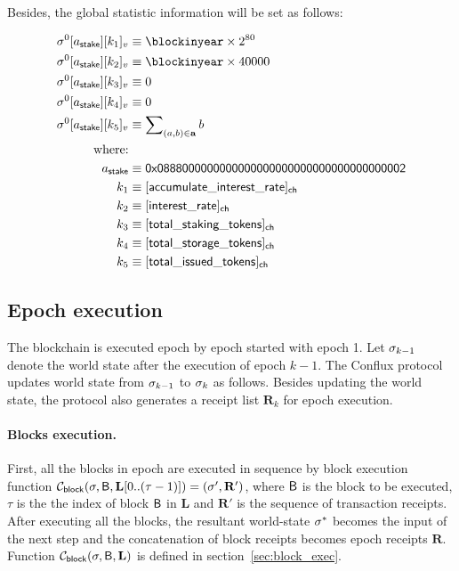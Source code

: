 Besides, the global statistic information will be set as follows:

\begin{align}
	\st^0[a_{\sf stake}][k_1]_v & \eqdef \blockinyear\times 2^{80} \\ 
	\st^0[a_{\sf stake}][k_2]_v & \eqdef \blockinyear\times 40000 \\
	\st^0[a_{\sf stake}][k_3]_v & \eqdef 0 \\
	\st^0[a_{\sf stake}][k_4]_v & \eqdef 0 \\
	\st^0[a_{\sf stake}][k_5]_v & \eqdef \sum\nolimits_{(a,b)\in \vec{a}} b \\
	\mbox{where:}&\\
	a_{\sf stake} &\eqdef \stakingcontract \\
	k_1 &\eqdef \sf [accumulate\char`_interest\char`_rate]_{\sf ch} \\ 
	k_2 &\eqdef \sf [interest\char`_rate]_{\sf ch} \\
    k_3 &\eqdef \sf [total\char`_staking\char`_tokens]_{\sf ch} \\
    k_4 &\eqdef \sf [total\char`_storage\char`_tokens]_{\sf ch} \\
    k_5 &\eqdef \sf [total\char`_issued\char`_tokens]_{\sf ch} 
\end{align}


\subsection{Epoch execution}

The blockchain is executed epoch by epoch started with epoch 1. Let $\mathbf{\sigma}_{k-1}$ denote the world state after the execution of epoch $k-1$. The Conflux protocol updates world state from $\mathbf{\sigma}_{k-1}$ to $\mathbf{\sigma}_k$ as follows. Besides updating the world state, the protocol also generates a receipt list $\mathbf{R}_k$ for epoch execution. 

\paragraph{Blocks execution. } First, all the blocks in epoch are executed in sequence by block execution function $\mathcal{C}_{\sf block}(\mathbf{\sigma},\textsf{B},\mathbf{L}[0..(\tau-1)])=(\mathbf{\sigma}',\mathbf{R}')$, where $\textsf{B}$ is the block to be executed, $\tau$ is the the index of block $\textsf{B}$ in $\mathbf{L}$ and $\mathbf{R}'$ is the sequence of transaction receipts. After executing all the blocks, the resultant world-state $\mathbf{\sigma}^*$ becomes the input of the next step and the concatenation of block receipts becomes epoch receipts $\mathbf{R}$. Function $\mathcal{C}_{\sf block}(\mathbf{\sigma},\textsf{B},\mathbf{L})$ is defined in section~\ref{sec:block_exec}.

